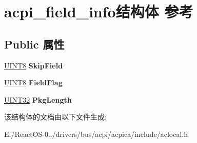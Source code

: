 \hypertarget{structacpi__field__info}{}\section{acpi\+\_\+field\+\_\+info结构体 参考}
\label{structacpi__field__info}
\subsection*{Public 属性}
\begin{DoxyCompactItemize}
\item 
\mbox{\label{structacpi__field__info_aa33b8001768c894a67ba0d3e45a1bc46}} 
\hyperlink{_processor_bind_8h_ab27e9918b538ce9d8ca692479b375b6a}{U\+I\+N\+T8} {\bfseries Skip\+Field}
\item 
\mbox{\label{structacpi__field__info_a8b6d89bef30924ac0aec93197640270d}} 
\hyperlink{_processor_bind_8h_ab27e9918b538ce9d8ca692479b375b6a}{U\+I\+N\+T8} {\bfseries Field\+Flag}
\item 
\mbox{\label{structacpi__field__info_a1ac0f5268f43986be89fc626df056644}} 
\hyperlink{_processor_bind_8h_ae1e6edbbc26d6fbc71a90190d0266018}{U\+I\+N\+T32} {\bfseries Pkg\+Length}
\end{DoxyCompactItemize}


该结构体的文档由以下文件生成\+:\begin{DoxyCompactItemize}
\item 
E\+:/\+React\+O\+S-\/0../drivers/bus/acpi/acpica/include/aclocal.\+h\end{DoxyCompactItemize}
